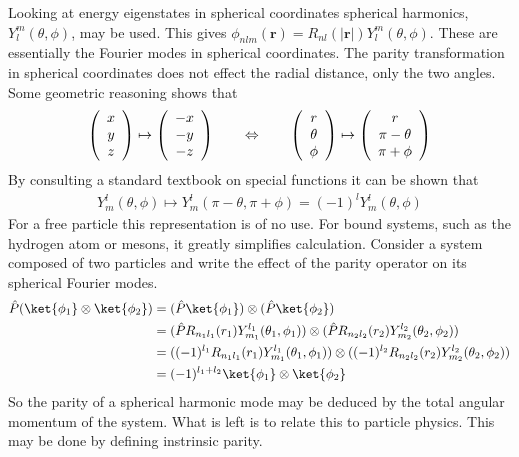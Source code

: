 Looking at energy eigenstates in spherical coordinates spherical harmonics, $Y^m_l(\theta,\phi)$, may be used. This gives $\phi_{nlm}(\mathbf{r})=R_{nl}(|\mathbf{r}|)Y^m_l(\theta,\phi)$. These are essentially the Fourier modes in spherical coordinates. The parity transformation in spherical coordinates does not effect the radial distance, only the two angles. Some geometric reasoning shows that
\begin{align*}
\left( \begin{array}{c} x \\ y \\ z \end{array} \right) \mapsto \left( \begin{array}{c} -x \\ -y \\ -z \end{array} \right) \hspace{7mm} \Leftrightarrow \hspace{7mm} \left( \begin{array}{c} r \\ \theta \\ \phi \end{array} \right) \mapsto \left( \begin{array}{c} r \\ \pi-\theta \\ \pi+\phi \end{array} \right)
\end{align*}
By consulting a standard textbook on special functions it can be shown that
\begin{align*}
Y^l_m(\theta,\phi)\mapsto Y^l_m(\pi-\theta,\pi+\phi) = (-1)^l Y^l_m(\theta,\phi)
\end{align*}
For a free particle this representation is of no use. For bound systems, such as the hydrogen atom or mesons, it greatly simplifies calculation. Consider a system composed of two particles and write the effect of the parity operator on its spherical Fourier modes.
\begin{align*}
\hat{P}(\ket{\phi_1}\otimes\ket{\phi_2}) &= (\hat{P}\ket{\phi_1})\otimes(\hat{P}\ket{\phi_2}) \\
&=(\hat{P}R_{n_1 l_1}(r_1)Y^{l_1}_{m_1}(\theta_1,\phi_1))\otimes(\hat{P}R_{n_2 l_2}(r_2)Y^{l_2}_{m_2}(\theta_2,\phi_2)) \\
&=((-1)^{l_1}R_{n_1 l_1}(r_1)Y^{l_1}_{m_1}(\theta_1,\phi_1))\otimes((-1)^{l_2}R_{n_2 l_2}(r_2)Y^{l_2}_{m_2}(\theta_2,\phi_2)) \\
&=(-1)^{l_1+l_2}\ket{\phi_1}\otimes\ket{\phi_2}
\end{align*}
So the parity of a spherical harmonic mode may be deduced by the total angular momentum of the system. What is left is to relate this to particle physics. This may be done by defining instrinsic parity.

